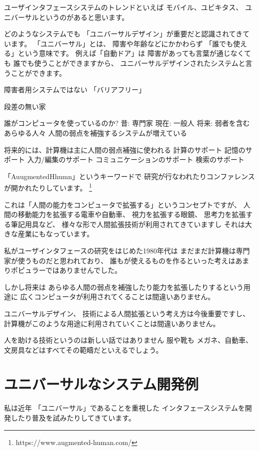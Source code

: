 \documentclass[topics]{compsoft} %
\begin{document}
ユーザインタフェースシステムのトレンドといえば
モバイル、ユビキタス、
ユニバーサルというのがあると思います。

どのようなシステムでも
「ユニバーサルデザイン」が重要だと認識されてきています。
「ユニバーサル」とは、
障害や年齢などにかかわらず
「誰でも使える」という意味です。
例えば「自動ドア」は
障害があっても言葉が通じなくても
誰でも使うことができますから、
ユニバーサルデザインされたシステムと言うことができます。




障害者用システムではない
「バリアフリー」

 段差の無い家

 誰がコンピュータを使っているのか?
 昔: 専門家
 現在: 一般人
 将来: 弱者を含むあらゆる人々
 人間の弱点を補強するシステムが増えている
  
 将来的には、計算機は主に人間の弱点補強に使われる
 計算のサポート
 記憶のサポート
 入力/編集のサポート
 コミュニケーションのサポート
 検索のサポート

「AuugmentedHhumn」というキーワードで
研究が行なわれたりコンファレンスが開かれたりしています。
\footnote{https://www.augmented-human.com/}

これは「人間の能力をコンピュータで拡張する」というコンセプトですが、
人間の移動能力を拡張する電車や自動車、
視力を拡張する眼鏡、
思考力を拡張する筆記用具など、
様々な形で人間拡張技術が利用されてきていますし
それは大きな産業にもなっています。


私がユーザインタフェースの研究をはじめた1980年代は
まだまだ計算機は専門家が使うものだと思われており、
誰もが使えるものを作るといった考えはあまりポピュラーではありませんでした。

しかし将来は
あらゆる人間の弱点を補強したり能力を拡張したりするという用途に
広くコンピュータが利用されてくることは間違いありません。


ユニバーサルデザイン、
 技術による人間拡張という考え方は今後重要ですし、
 計算機がこのような用途に利用されていくことは間違いありません。



人を助ける技術というのは新しい話ではありません
服や靴も
メガネ、自動車、文房具などはすべてその範疇だといえるでしょう。

 
\section{ユニバーサルなシステム開発例}

私は近年
「ユニバーサル」であることを重視した
インタフェースシステムを開発したり普及を試みたりしてきています。
\end{document}

